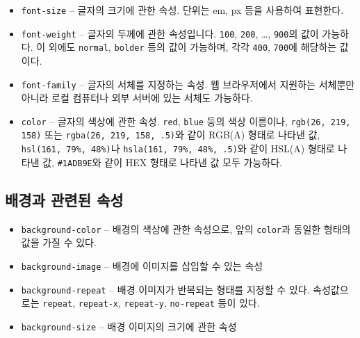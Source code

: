 \begin{itemize}
    \item \texttt{font-size} – 글자의 크기에 관한 속성. 단위는 em, px 등을 사용하여 표현한다.
    \item \texttt{font-weight} – 글자의 두께에 관한 속성입니다. \texttt{100}, \texttt{200}, \ldots, \texttt{900}의 값이 가능하다. 이 외에도 \texttt{normal}, \texttt{bolder} 등의 값이 가능하며, 각각 \texttt{400}, \texttt{700}에 해당하는 값이다.
    \item \texttt{font-family} – 글자의 서체를 지정하는 속성. 웹 브라우저에서 지원하는 서체뿐만 아니라 로컬 컴퓨터나 외부 서버에 있는 서체도 가능하다.
    \item \texttt{color} – 글자의 색상에 관한 속성. \texttt{red}, \texttt{blue} 등의 색상 이름이나, \texttt{rgb(26, 219, 158)} 또는 \texttt{rgba(26, 219, 158, .5)}와 같이 RGB(A) 형태로 나타낸 값, \texttt{hsl(161, 79\%, 48\%)}나 \texttt{hsla(161, 79\%, 48\%, .5)}와 같이 HSL(A) 형태로 나타낸 값, \texttt{\#1ADB9E}와 같이 HEX 형태로 나타낸 값 모두 가능하다.
\end{itemize}

\subsection*{배경과 관련된 속성}

\begin{itemize}
    \item \texttt{background-color} – 배경의 색상에 관한 속성으로, 앞의 \texttt{color}과 동일한 형태의 값을 가질 수 있다.
    \item \texttt{background-image} – 배경에 이미지를 삽입할 수 있는 속성
    \item \texttt{background-repeat} – 배경 이미지가 반복되는 형태를 지정할 수 있다. 속성값으로는 \texttt{repeat}, \texttt{repeat-x}, \texttt{repeat-y}, \texttt{no-repeat} 등이 있다.
    \item \texttt{background-size} – 배경 이미지의 크기에 관한 속성
\end{itemize}
